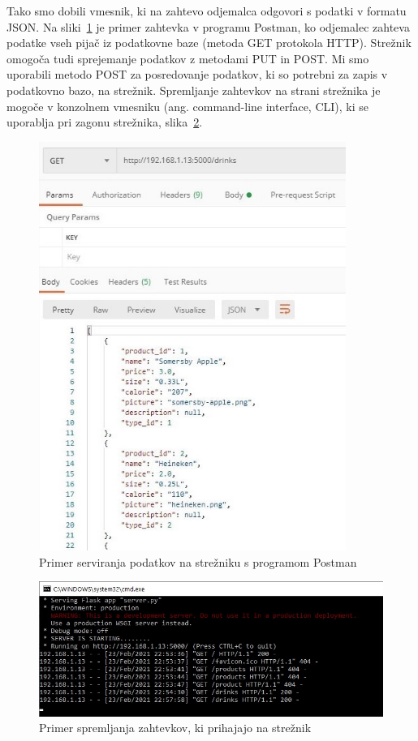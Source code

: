 \documentclass[a4paper, 12pt]{book}
\begin{document}
Tako smo dobili vmesnik, ki na zahtevo odjemalca odgovori s podatki v formatu JSON. Na sliki~\ref{ServerEX} je primer zahtevka v programu Postman, ko odjemalec zahteva podatke vseh pijač iz podatkovne baze (metoda GET protokola HTTP). Strežnik omogoča tudi sprejemanje podatkov z metodami PUT in POST. Mi smo uporabili metodo POST za posredovanje podatkov, ki so potrebni za zapis v podatkovno bazo, na strežnik. Spremljanje zahtevkov na strani strežnika je mogoče v konzolnem vmesniku (ang. command-line interface, CLI), ki se uporablja pri zagonu strežnika, slika~\ref{ServerEX2}.

\begin{figure}[!htb]   
\begin{center}
\includegraphics[width=10cm]{Server_example.jpg}
\caption{Primer serviranja podatkov na strežniku s programom Postman}
\label{ServerEX}
\end{center}
\end{figure}

\begin{figure}[!htb]
\begin{center}
\includegraphics[width=12cm]{Server_example_2.jpg}
\caption{Primer spremljanja zahtevkov, ki prihajajo na strežnik}
\label{ServerEX2}
\end{center}
\end{figure}
\end{document}
